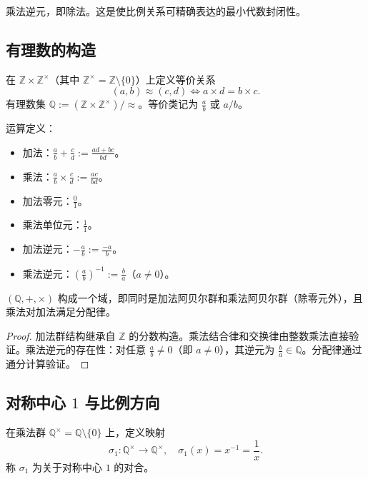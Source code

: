 乘法逆元，即除法。这是使比例关系可精确表达的最小代数封闭性。

\subsection{\texorpdfstring{有理数的构造}{有理数的构造}}

\begin{definition}[有理数的构造]\label{def:rational_construction}
在 $\mathbb{Z} \times \mathbb{Z}^{\times}$（其中 $\mathbb{Z}^{\times} = \mathbb{Z} \setminus \{0\}$）上定义等价关系
\[
(a,b) \approx (c,d) \iff a \times d = b \times c.
\]
有理数集 $\mathbb{Q} := (\mathbb{Z} \times \mathbb{Z}^{\times}) / \approx$。等价类记为 $\frac{a}{b}$ 或 $a/b$。

运算定义：
\begin{itemize}
    \item 加法：$\frac{a}{b} + \frac{c}{d} := \frac{ad+bc}{bd}$。
    \item 乘法：$\frac{a}{b} \times \frac{c}{d} := \frac{ac}{bd}$。
    \item 加法零元：$\frac{0}{1}$。
    \item 乘法单位元：$\frac{1}{1}$。
    \item 加法逆元：$-\frac{a}{b} := \frac{-a}{b}$。
    \item 乘法逆元：$(\frac{a}{b})^{-1} := \frac{b}{a}$（$a \neq 0$）。
\end{itemize}
\end{definition}

\begin{proposition}[有理数是域]\label{prop:rational_field}
$(\mathbb{Q},+,\times)$ 构成一个域，即同时是加法阿贝尔群和乘法阿贝尔群（除零元外），且乘法对加法满足分配律。
\end{proposition}

\begin{proof}
加法群结构继承自 $\mathbb{Z}$ 的分数构造。乘法结合律和交换律由整数乘法直接验证。乘法逆元的存在性：对任意 $\frac{a}{b} \neq 0$（即 $a \neq 0$），其逆元为 $\frac{b}{a} \in \mathbb{Q}$。分配律通过通分计算验证。
\end{proof}

\subsection{\texorpdfstring{对称中心 $1$ 与比例方向}{对称中心 1 与比例方向}}

\begin{definition}\label{def:rational_involution}
在乘法群 $\mathbb{Q}^{\times} = \mathbb{Q} \setminus \{0\}$ 上，定义映射
\[
\sigma_1: \mathbb{Q}^{\times} \to \mathbb{Q}^{\times}, \quad \sigma_1(x) = x^{-1} = \frac{1}{x}.
\]
称 $\sigma_1$ 为关于对称中心 $1$ 的对合。
\end{definition}

